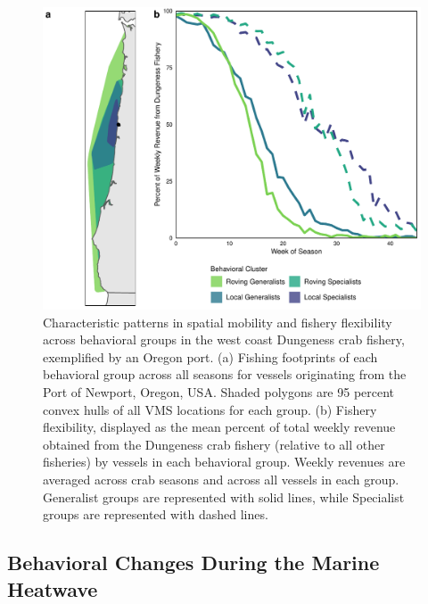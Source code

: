 \documentclass[]{elsarticle} %
\begin{document}
\begin{figure}%
\includegraphics[width=\linewidth]{groups_mobility_flexibility.pdf}
\caption{Characteristic patterns in spatial mobility and fishery flexibility across behavioral groups in the west coast Dungeness crab fishery, exemplified by an Oregon port. (a) Fishing footprints of each behavioral group across all seasons for vessels originating from the Port of Newport, Oregon, USA. Shaded polygons are 95 percent convex hulls of all VMS locations for each group. (b) Fishery flexibility, displayed as the mean percent of total weekly revenue obtained from the Dungeness crab fishery (relative to all other fisheries) by vessels in each behavioral group. Weekly revenues are averaged across crab seasons and across all vessels in each group. Generalist groups are represented with solid lines, while Specialist groups are represented with dashed lines.}
\label{fig:characteristics}
\end{figure}

\hypertarget{behavioral-changes-during-the-marine-heatwave}{%
\subsection{Behavioral Changes During the Marine
Heatwave}\label{behavioral-changes-during-the-marine-heatwave}}
\end{document}
